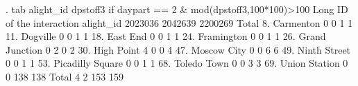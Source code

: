 . tab alight_id dpstoff3 if daypart == 2 \& mod(dpstoff3,100*100)>100
{\smallskip}
                      {\VBAR}    Long ID of the interaction
            alight_id {\VBAR}   2023036    2042639    2200269 {\VBAR}     Total
         8. Carmenton {\VBAR}         0          0          1 {\VBAR}         1 
         11. Dogville {\VBAR}         0          0          1 {\VBAR}         1 
         18. East End {\VBAR}         0          0          1 {\VBAR}         1 
       24. Framington {\VBAR}         0          0          1 {\VBAR}         1 
   26. Grand Junction {\VBAR}         0          2          0 {\VBAR}         2 
       30. High Point {\VBAR}         4          0          0 {\VBAR}         4 
      47. Moscow City {\VBAR}         0          0          6 {\VBAR}         6 
     49. Ninth Street {\VBAR}         0          0          1 {\VBAR}         1 
 53. Picadilly Square {\VBAR}         0          0          1 {\VBAR}         1 
      68. Toledo Town {\VBAR}         0          0          3 {\VBAR}         3 
    69. Union Station {\VBAR}         0          0        138 {\VBAR}       138 
                Total {\VBAR}         4          2        153 {\VBAR}       159 
{\smallskip}
{\smallskip}
